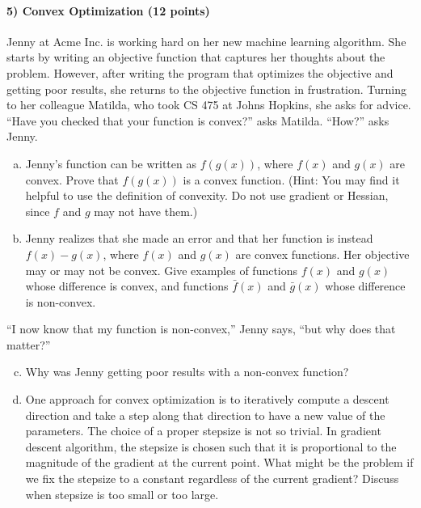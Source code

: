 \documentclass[11pt]{article}
\begin{document}
\paragraph{5) Convex Optimization (12 points)}
Jenny at Acme Inc. is working hard on her new machine learning algorithm. She starts by writing an objective function
that captures her thoughts about the problem. However, after writing the program that optimizes the objective
and getting poor results, she returns to the objective function in frustration. Turning to her colleague Matilda,
who took CS 475 at Johns Hopkins, she asks for advice. ``Have you checked that your function is convex?'' asks Matilda.
``How?'' asks Jenny.
\begin{enumerate}[(a)]
\item Jenny's function can be written as $f(g(x))$, where $f(x)$ and $g(x)$ are convex. Prove that $f(g(x))$ is a convex function. (Hint: You may find it helpful to use the definition of convexity. Do not use gradient or Hessian, since $f$ and $g$ may not have them.)
\item Jenny realizes that she made an error and that her function is instead
$f(x)-g(x)$, where $f(x)$ and $g(x)$ are convex functions. Her objective may or may not be convex. Give examples of functions $f(x)$ and $g(x)$ whose difference is convex, and functions $\bar{f}(x)$ and $\bar{g}(x)$ whose difference is non-convex.
\end{enumerate}
``I now know that my function is non-convex,'' Jenny says, ``but why does that matter?''
\begin{enumerate}[(a)]
\setcounter{enumi}{2}
\item Why was Jenny getting poor results with a non-convex function?
\item One approach for convex optimization is to iteratively compute a descent direction and take a step along that direction to have a new value of the parameters. The choice of a proper stepsize is not so trivial. In gradient descent algorithm, the stepsize is chosen such that it is proportional to the magnitude of the gradient at the current point. What might be the problem if we fix the stepsize to a constant regardless of the current gradient? Discuss when stepsize is too small or too large.
\end{enumerate}
\end{document}
